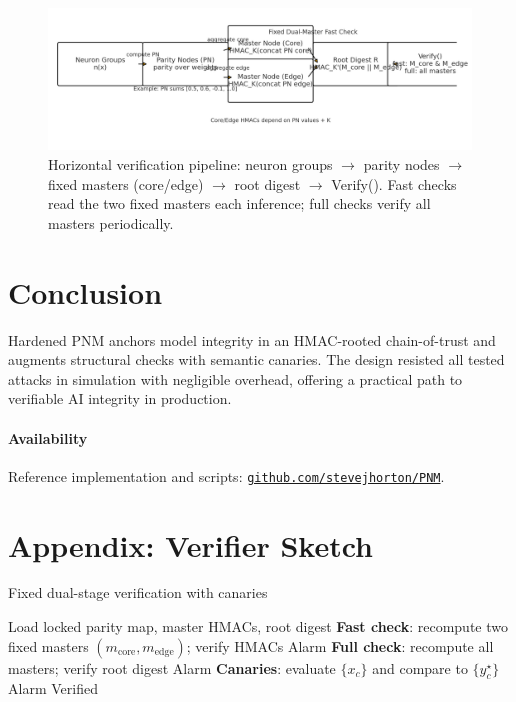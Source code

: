 \documentclass[11pt]{article}
\begin{document}
\begin{figure}[!htbp]
\centering
\includegraphics[width=\linewidth]{pnm_pipeline.png}
\caption{Horizontal verification pipeline: neuron groups $\rightarrow$ parity nodes $\rightarrow$ fixed masters (core/edge) $\rightarrow$ root digest $\rightarrow$ Verify(). Fast checks read the two fixed masters each inference; full checks verify all masters periodically.}
\label{fig:pipeline}
\end{figure}

\FloatBarrier
\section{Conclusion}
Hardened PNM anchors model integrity in an HMAC-rooted chain-of-trust and augments structural checks with semantic canaries. The design resisted all tested attacks in simulation with negligible overhead, offering a practical path to verifiable AI integrity in production.

\paragraph{Availability}
Reference implementation and scripts: \href{https://github.com/stevejhorton/PNM}{\texttt{github.com/stevejhorton/PNM}}.

\clearpage



\appendix
\section{Appendix: Verifier Sketch}
\begin{algorithm}[H]
\caption{Fixed dual-stage verification with canaries}
\begin{algorithmic}[1]
\State Load locked parity map, master HMACs, root digest
\State \textbf{Fast check}: recompute two fixed masters $(m_{\mathrm{core}}, m_{\mathrm{edge}})$; verify HMACs
 \State \Return Alarm \EndIf
\State \textbf{Full check}: recompute all masters; verify root digest
 \State \Return Alarm \EndIf
\State \textbf{Canaries}: evaluate $\{x_c\}$ and compare to $\{y_c^\star\}$
 \State \Return Alarm \Else \Return Verified \EndIf
\end{algorithmic}
\end{algorithm}
\end{document}
